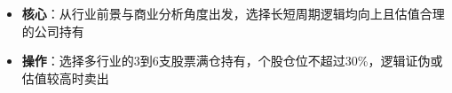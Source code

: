   \begin{itemize}[leftmargin=*]
    \item \textbf{核心}：从行业前景与商业分析角度出发，选择长短周期逻辑均向上且估值合理的公司持有
    \item \textbf{操作}：选择多行业的3到6支股票满仓持有，个股仓位不超过30\%，逻辑证伪或估值较高时卖出
  \end{itemize}